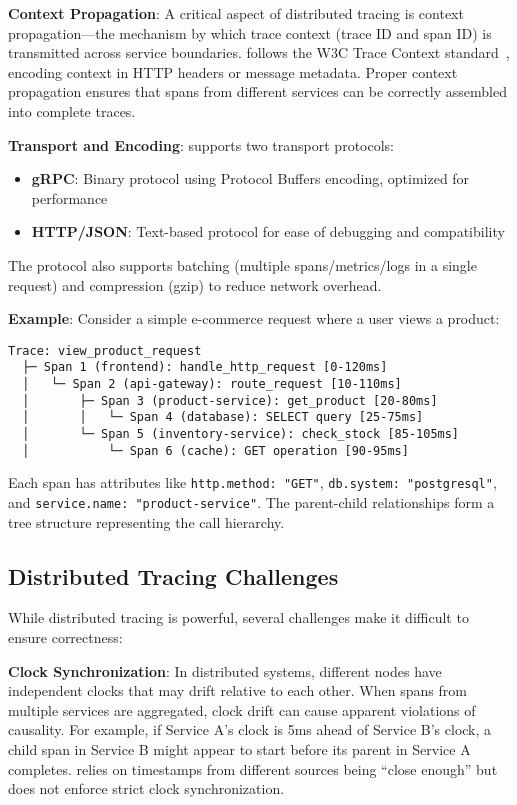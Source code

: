 \textbf{Context Propagation}: A critical aspect of distributed tracing is context propagation---the mechanism by which trace context (trace ID and span ID) is transmitted across service boundaries. \otlp follows the W3C Trace Context standard~\cite{w3c-trace-context}, encoding context in HTTP headers or message metadata. Proper context propagation ensures that spans from different services can be correctly assembled into complete traces.

\textbf{Transport and Encoding}: \otlp supports two transport protocols:
\begin{itemize}
\item \textbf{gRPC}: Binary protocol using Protocol Buffers encoding, optimized for performance
\item \textbf{HTTP/JSON}: Text-based protocol for ease of debugging and compatibility
\end{itemize}

The protocol also supports batching (multiple spans/metrics/logs in a single request) and compression (gzip) to reduce network overhead.

\textbf{Example}: Consider a simple e-commerce request where a user views a product:

\begin{small}
\begin{verbatim}
Trace: view_product_request
  ├─ Span 1 (frontend): handle_http_request [0-120ms]
  │   └─ Span 2 (api-gateway): route_request [10-110ms]
  │       ├─ Span 3 (product-service): get_product [20-80ms]
  │       │   └─ Span 4 (database): SELECT query [25-75ms]
  │       └─ Span 5 (inventory-service): check_stock [85-105ms]
  │           └─ Span 6 (cache): GET operation [90-95ms]
\end{verbatim}
\end{small}

Each span has attributes like \texttt{http.method: "GET"}, \texttt{db.system: "postgresql"}, and \texttt{service.name: "product-service"}. The parent-child relationships form a tree structure representing the call hierarchy.

\subsection{Distributed Tracing Challenges}
\label{sec:background-challenges}

While distributed tracing is powerful, several challenges make it difficult to ensure correctness:

\textbf{Clock Synchronization}: In distributed systems, different nodes have independent clocks that may drift relative to each other. When spans from multiple services are aggregated, clock drift can cause apparent violations of causality. For example, if Service A's clock is 5ms ahead of Service B's clock, a child span in Service B might appear to start before its parent in Service A completes. \otlp relies on timestamps from different sources being ``close enough'' but does not enforce strict clock synchronization.

